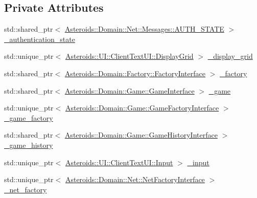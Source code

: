 \subsection*{Private Attributes}
\begin{DoxyCompactItemize}
\item 
std\+::shared\+\_\+ptr$<$ \hyperlink{classAsteroids_1_1Domain_1_1Net_1_1Messages_1_1AUTH__STATE}{Asteroids\+::\+Domain\+::\+Net\+::\+Messages\+::\+A\+U\+T\+H\+\_\+\+S\+T\+A\+TE} $>$ \hyperlink{classAsteroids_1_1UI_1_1ClientTextUI_1_1ClientTextUI_ae52171fdbc596c6a59c81635794991e8}{\+\_\+authentication\+\_\+state}
\item 
std\+::unique\+\_\+ptr$<$ \hyperlink{classAsteroids_1_1UI_1_1ClientTextUI_1_1DisplayGrid}{Asteroids\+::\+U\+I\+::\+Client\+Text\+U\+I\+::\+Display\+Grid} $>$ \hyperlink{classAsteroids_1_1UI_1_1ClientTextUI_1_1ClientTextUI_acab5b0f0efd512d54c4168d5ea0d67fe}{\+\_\+display\+\_\+grid}
\item 
std\+::shared\+\_\+ptr$<$ \hyperlink{classAsteroids_1_1Domain_1_1Factory_1_1FactoryInterface}{Asteroids\+::\+Domain\+::\+Factory\+::\+Factory\+Interface} $>$ \hyperlink{classAsteroids_1_1UI_1_1ClientTextUI_1_1ClientTextUI_abb34be5ffc1f0f83b1b7005ef6371026}{\+\_\+factory}
\item 
std\+::shared\+\_\+ptr$<$ \hyperlink{classAsteroids_1_1Domain_1_1Game_1_1GameInterface}{Asteroids\+::\+Domain\+::\+Game\+::\+Game\+Interface} $>$ \hyperlink{classAsteroids_1_1UI_1_1ClientTextUI_1_1ClientTextUI_aad702d0c440eb1d0b3e6a8532f2bc68a}{\+\_\+game}
\item 
std\+::unique\+\_\+ptr$<$ \hyperlink{classAsteroids_1_1Domain_1_1Game_1_1GameFactoryInterface}{Asteroids\+::\+Domain\+::\+Game\+::\+Game\+Factory\+Interface} $>$ \hyperlink{classAsteroids_1_1UI_1_1ClientTextUI_1_1ClientTextUI_a5b8e9f49274c1facac8895c111c4ed25}{\+\_\+game\+\_\+factory}
\item 
std\+::shared\+\_\+ptr$<$ \hyperlink{classAsteroids_1_1Domain_1_1Game_1_1GameHistoryInterface}{Asteroids\+::\+Domain\+::\+Game\+::\+Game\+History\+Interface} $>$ \hyperlink{classAsteroids_1_1UI_1_1ClientTextUI_1_1ClientTextUI_a31468f9f3a6239ae0c8e56ffb9505acd}{\+\_\+game\+\_\+history}
\item 
std\+::unique\+\_\+ptr$<$ \hyperlink{classAsteroids_1_1UI_1_1ClientTextUI_1_1Input}{Asteroids\+::\+U\+I\+::\+Client\+Text\+U\+I\+::\+Input} $>$ \hyperlink{classAsteroids_1_1UI_1_1ClientTextUI_1_1ClientTextUI_a3c8cfb8f7896e7ea7ca10da23871d94c}{\+\_\+input}
\item 
std\+::unique\+\_\+ptr$<$ \hyperlink{classAsteroids_1_1Domain_1_1Net_1_1NetFactoryInterface}{Asteroids\+::\+Domain\+::\+Net\+::\+Net\+Factory\+Interface} $>$ \hyperlink{classAsteroids_1_1UI_1_1ClientTextUI_1_1ClientTextUI_ab6854b036563ab75f3768545a04408c2}{\+\_\+net\+\_\+factory}

\end{DoxyCompactItemize}
